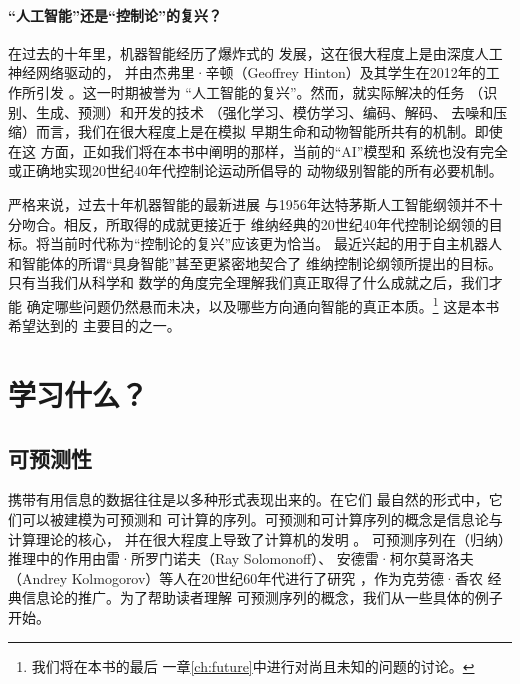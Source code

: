 \documentclass[../../book-main_zh.tex]{subfiles}
\begin{document}
\paragraph{“人工智能”还是“控制论”的复兴？}
在过去的十年里，机器智能经历了爆炸式的
发展，这在很大程度上是由深度人工神经网络驱动的，
并由杰弗里·辛顿（Geoffrey Hinton）及其学生在2012年的工作所引发
\cite{krizhevsky2012imagenet}。这一时期被誉为
“人工智能的复兴”。然而，就实际解决的任务
（识别、生成、预测）和开发的技术
（强化学习、模仿学习、编码、解码、
去噪和压缩）而言，我们在很大程度上是在模拟
早期生命和动物智能所共有的机制。即使在这
方面，正如我们将在本书中阐明的那样，当前的“AI”模型和
系统也没有完全或正确地实现20世纪40年代控制论运动所倡导的
动物级别智能的所有必要机制。

严格来说，过去十年机器智能的最新进展
与1956年达特茅斯人工智能纲领并不十分吻合。相反，所取得的成就更接近于
维纳经典的20世纪40年代控制论纲领的目标。将当前时代称为“控制论的复兴”应该更为恰当。
最近兴起的用于自主机器人和智能体的所谓“具身智能”甚至更紧密地契合了
维纳控制论纲领所提出的目标。只有当我们从科学和
数学的角度完全理解我们真正取得了什么成就之后，我们才能
确定哪些问题仍然悬而未决，以及哪些方向通向智能的真正本质。\footnote{我们将在本书的最后
一章\ref{ch:future}中进行对尚且未知的问题的讨论。} 这是本书希望达到的
主要目的之一。

\section{学习什么？}
\label{sec:what-to-learn}

\subsection{可预测性}
\label{sec:predictability}
携带有用信息的数据往往是以多种形式表现出来的。在它们
最自然的形式中，它们可以被建模为可预测和
可计算的序列。可预测和可计算序列的概念是信息论\cite{Shannon-1948}与计算理论的核心，
并在很大程度上导致了计算机的发明 \cite{Turing-1936}。
可预测序列在（归纳）推理中的作用由雷·所罗门诺夫（Ray Solomonoff）、
安德雷·柯尔莫哥洛夫（Andrey Kolmogorov）等人在20世纪60年代进行了研究
\cite{Kolmogorov1998OnTO}，作为克劳德·香农
经典信息论的推广。为了帮助读者理解
可预测序列的概念，我们从一些具体的例子开始。
\end{document}
